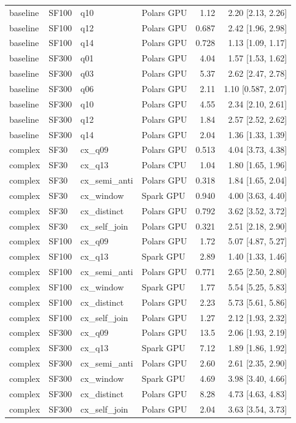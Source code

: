 \begin{longtable}{llllrr}
baseline & SF100 & q10 & Polars GPU & 1.12 & 2.20 [2.13, 2.26] \\
baseline & SF100 & q12 & Polars GPU & 0.687 & 2.42 [1.96, 2.98] \\
baseline & SF100 & q14 & Polars GPU & 0.728 & 1.13 [1.09, 1.17] \\
baseline & SF300 & q01 & Polars GPU & 4.04 & 1.57 [1.53, 1.62] \\
baseline & SF300 & q03 & Polars GPU & 5.37 & 2.62 [2.47, 2.78] \\
baseline & SF300 & q06 & Polars GPU & 2.11 & 1.10 [0.587, 2.07] \\
baseline & SF300 & q10 & Polars GPU & 4.55 & 2.34 [2.10, 2.61] \\
baseline & SF300 & q12 & Polars GPU & 1.84 & 2.57 [2.52, 2.62] \\
baseline & SF300 & q14 & Polars GPU & 2.04 & 1.36 [1.33, 1.39] \\
complex & SF30 & cx\_q09 & Polars GPU & 0.513 & 4.04 [3.73, 4.38] \\
complex & SF30 & cx\_q13 & Polars CPU & 1.04 & 1.80 [1.65, 1.96] \\
complex & SF30 & cx\_semi\_anti & Polars GPU & 0.318 & 1.84 [1.65, 2.04] \\
complex & SF30 & cx\_window & Spark GPU & 0.940 & 4.00 [3.63, 4.40] \\
complex & SF30 & cx\_distinct & Polars GPU & 0.792 & 3.62 [3.52, 3.72] \\
complex & SF30 & cx\_self\_join & Polars GPU & 0.321 & 2.51 [2.18, 2.90] \\
complex & SF100 & cx\_q09 & Polars GPU & 1.72 & 5.07 [4.87, 5.27] \\
complex & SF100 & cx\_q13 & Spark GPU & 2.89 & 1.40 [1.33, 1.46] \\
complex & SF100 & cx\_semi\_anti & Polars GPU & 0.771 & 2.65 [2.50, 2.80] \\
complex & SF100 & cx\_window & Spark GPU & 1.77 & 5.54 [5.25, 5.83] \\
complex & SF100 & cx\_distinct & Polars GPU & 2.23 & 5.73 [5.61, 5.86] \\
complex & SF100 & cx\_self\_join & Polars GPU & 1.27 & 2.12 [1.93, 2.32] \\
complex & SF300 & cx\_q09 & Polars GPU & 13.5 & 2.06 [1.93, 2.19] \\
complex & SF300 & cx\_q13 & Spark GPU & 7.12 & 1.89 [1.86, 1.92] \\
complex & SF300 & cx\_semi\_anti & Polars GPU & 2.60 & 2.61 [2.35, 2.90] \\
complex & SF300 & cx\_window & Spark GPU & 4.69 & 3.98 [3.40, 4.66] \\
complex & SF300 & cx\_distinct & Polars GPU & 8.28 & 4.73 [4.63, 4.83] \\
complex & SF300 & cx\_self\_join & Polars GPU & 2.04 & 3.63 [3.54, 3.73] \\
\end{longtable}

